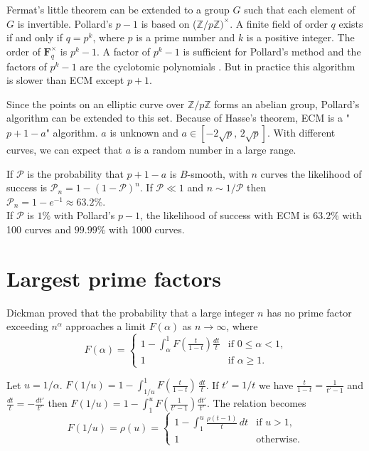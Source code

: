 \documentclass[a4paper, 11pt, pdftex]{report}
\theoremstyle{plain}
\theoremstyle{definition}
\begin{document}
Fermat's little theorem can be extended to a group $G$ such that each element of $G$ is invertible. 
Pollard's $p - 1$ is based on ($\mathbb{Z}/p\mathbb{Z})^\times$.  A finite field of order $q$ exists
if and only if $q = p^k$, where $p$ is a prime number and $k$ is a positive integer. The order of
$\mathbf{F}_q^\times$ is $p^k - 1$. A factor of $p^k - 1$ is sufficient for Pollard's method and
the factors of $p^k - 1$ are the cyclotomic polynomials \cite{BachShallit1}. But in practice
this algorithm is slower than ECM except $p + 1$.

Since the points on an elliptic curve over $\mathbb{Z}/p\mathbb{Z}$ forms an abelian group,
Pollard's algorithm can be extended to this set. Because of Hasse's theorem, ECM is a
"$p + 1 - a$" algorithm. $a$ is unknown and $a \in [-2\sqrt{p},\, 2\sqrt{p}]$. With different curves,
we can expect that $a$ is a random number in a large range.

If $\mathcal{P}$ is the probability that $p + 1 - a$ is $B$-smooth, with $n$ curves
the likelihood of success is $\mathcal{P}_n = 1 - (1 - \mathcal{P})^n$. If $\mathcal{P} \ll 1$
and $n \sim 1/\mathcal{P}$ then $\mathcal{P}_n = 1 - e^{-1} \approx 63.2\% $.\\
If $\mathcal{P}$ is $1\%$ with Pollard's $p - 1$, the likelihood of success with ECM
is $63.2\% $ with 100 curves and $99.99\% $ with 1000 curves.

\section{Largest prime factors} \label{chap:l_prm_fact}

Dickman \cite{Dickman1} proved that the probability that a large integer $n$ has no prime factor
exceeding $n^\alpha$ approaches a limit $F(\alpha)$ as $n \to \infty$, where
\begin{equation*}
F(\alpha) = \begin{cases}
1 - \int_\alpha^1 F \left(\frac{t}{1-t} \right) \frac{dt}{t} & \text{if } 0 \leq \alpha < 1 \text{,}\\
1& \text{if } \alpha \geq 1 \text{.}
\end{cases}
\end{equation*}

Let $u = 1/\alpha$. $F(1/u) = 1 - \int_{1/u}^1 F \left(\frac{t}{1-t} \right)\, \frac{dt}{t}$.
If $t' = 1/t$ we have $\frac{t}{1-t} = \frac{1}{t' - 1}$ and $\frac{dt}{t} = -\frac{dt'}{t'}$
then $F(1/u) = 1 - \int_1^u F \left(\frac{1}{t' - 1} \right) \frac{dt'}{t'}$. The relation becomes
\begin{equation*}
F(1/u) = \rho(u) = \begin{cases}
1 - \int_1^u \frac{\rho(t - 1)}{t}\, dt & \text{if } u > 1 \text{,}\\
1 & \text{otherwise.}
\end{cases}
\end{equation*}
\end{document}
